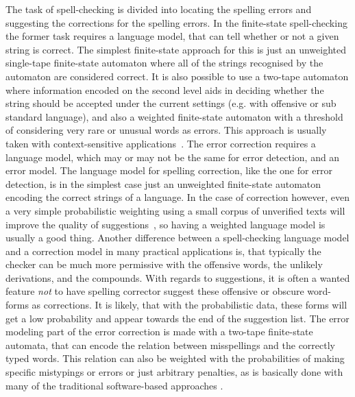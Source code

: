 \documentclass[a4paper,12pt]{article}
\begin{document}
The task of spell-checking is divided into locating the spelling errors and
suggesting the corrections for the spelling errors. In the finite-state
spell-checking the former task requires a language model, that can tell whether
or not a given string is correct. The simplest finite-state approach for this
is just an unweighted single-tape finite-state automaton where all of the
strings recognised by the automaton are considered correct. It is also possible
to use a two-tape automaton where information encoded on the second level aids
in deciding whether the string should be accepted under the current settings
(e.g.  with offensive or sub standard language), and also a weighted
finite-state automaton with a threshold of considering very rare or unusual
words as errors.  This approach is usually taken with context-sensitive
applications~\cite[]{otero/2007}. The error correction requires a language
model, which may or may not be the same for error detection, and an error
model.  The language model for spelling correction, like the one for error
detection, is in the simplest case just an unweighted finite-state automaton
encoding the correct strings of a language. In the case of correction however,
even a very simple probabilistic weighting using a small corpus of unverified
texts will improve the quality of suggestions~\cite[]{pirinen/2010/lrec}, so
having a weighted language model is usually a good thing. Another difference
between a spell-checking language model and a correction model in many
practical applications is, that typically the checker can be much more
permissive with the offensive words, the unlikely derivations, and the
compounds. With regards to suggestions, it is often a wanted feature \emph{not}
to have spelling corrector suggest these offensive or obscure word-forms as
corrections. It is likely, that with the probabilistic data, these forms will
get a low probability and appear towards the end of the suggestion list. The
error modeling part of the error correction is made with a two-tape
finite-state automata, that can encode the relation between misspellings and
the correctly typed words. This relation can also be weighted with the
probabilities of making specific mistypings or errors or just arbitrary
penalties, as is basically done with many of the traditional software-based
approaches \cite[such as][]{hunspell/manual}.
\end{document}
